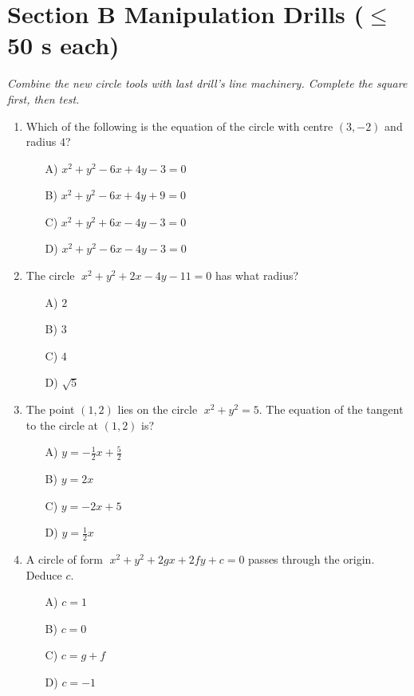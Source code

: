 \documentclass[11pt,a4paper]{article}
\begin{document}
\section*{Section B \quad Manipulation Drills \hfill{\normalfont\small($\leq$50 s each)}}

\noindent\textit{Combine the new circle tools with last drill's line machinery. Complete the square first, then test.}

\begin{enumerate}

\item Which of the following is the equation of the circle with centre $(3,-2)$ and radius $4$?
\begin{itemize}
\item[A)] $x^2+y^2-6x+4y-3=0$
\item[B)] $x^2+y^2-6x+4y+9=0$
\item[C)] $x^2+y^2+6x-4y-3=0$
\item[D)] $x^2+y^2-6x-4y-3=0$
\end{itemize}

\item The circle $\;x^2+y^2+2x-4y-11=0$ has what radius?
\begin{itemize}
\item[A)] $2$
\item[B)] $3$
\item[C)] $4$
\item[D)] $\sqrt{5}$
\end{itemize}

\item The point $(1,2)$ lies on the circle $\;x^2+y^2=5$. The equation of the tangent to the circle at $(1,2)$ is?
\begin{itemize}
\item[A)] $y = -\frac{1}{2}x + \frac{5}{2}$
\item[B)] $y = 2x$
\item[C)] $y = -2x + 5$
\item[D)] $y = \frac{1}{2}x$
\end{itemize}

\item A circle of form $\;x^2+y^2+2gx+2fy+c=0$ passes through the origin. Deduce $c$.
\begin{itemize}
\item[A)] $c = 1$
\item[B)] $c = 0$
\item[C)] $c = g + f$
\item[D)] $c = -1$
\end{itemize}


\end{enumerate}
\end{document}
